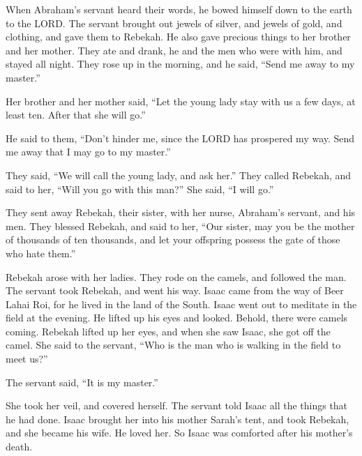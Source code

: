 \myverse{}When Abraham’s servant heard their words, he bowed himself down to the earth to the LORD. \myverse{}The servant brought out jewels of silver, and jewels of gold, and clothing, and gave them to Rebekah. He also gave precious things to her brother and her mother. \myverse{}They ate and drank, he and the men who were with him, and stayed all night. They rose up in the morning, and he said, “Send me away to my master.”

\myverse{}Her brother and her mother said, “Let the young lady stay with us a few days, at least ten. After that she will go.”

\myverse{}He said to them, “Don’t hinder me, since the LORD has prospered my way. Send me away that I may go to my master.”

\myverse{}They said, “We will call the young lady, and ask her.” \myverse{}They called Rebekah, and said to her, “Will you go with this man?”
She said, “I will go.”

\myverse{}They sent away Rebekah, their sister, with her nurse, Abraham’s servant, and his men. \myverse{}They blessed Rebekah, and said to her, “Our sister, may you be the mother of thousands of ten thousands, and let your offspring possess the gate of those who hate them.”

\myverse{}Rebekah arose with her ladies. They rode on the camels, and followed the man. The servant took Rebekah, and went his way. \myverse{}Isaac came from the way of Beer Lahai Roi, for he lived in the land of the South. \myverse{}Isaac went out to meditate in the field at the evening. He lifted up his eyes and looked. Behold, there were camels coming. \myverse{}Rebekah lifted up her eyes, and when she saw Isaac, she got off the camel. \myverse{} She said to the servant, “Who is the man who is walking in the field to meet us?”

The servant said, “It is my master.”

She took her veil, and covered herself. \myverse{}The servant told Isaac all the things that he had done. \myverse{}Isaac brought her into his mother Sarah’s tent, and took Rebekah, and she became his wife. He loved her. So Isaac was comforted after his mother’s death.

